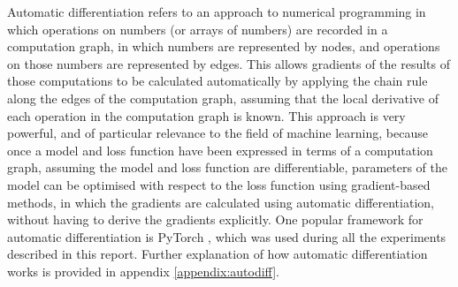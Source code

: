 Automatic differentiation refers to an approach to numerical programming in which operations on numbers (or arrays of numbers) are recorded in a computation graph, in which numbers are represented by nodes, and operations on those numbers are represented by edges. This allows gradients of the results of those computations to be calculated automatically by applying the chain rule along the edges of the computation graph, assuming that the local derivative of each operation in the computation graph is known. This approach is very powerful, and of particular relevance to the field of machine learning, because once a model and loss function have been expressed in terms of a computation graph, assuming the model and loss function are differentiable, parameters of the model can be optimised with respect to the loss function using gradient-based methods, in which the gradients are calculated using automatic differentiation, without having to derive the gradients explicitly. One popular framework for automatic differentiation is PyTorch \cite{paszke2019pytorch}, which was used during all the experiments described in this report. Further explanation of how automatic differentiation works is provided in appendix \ref{appendix:autodiff}.
